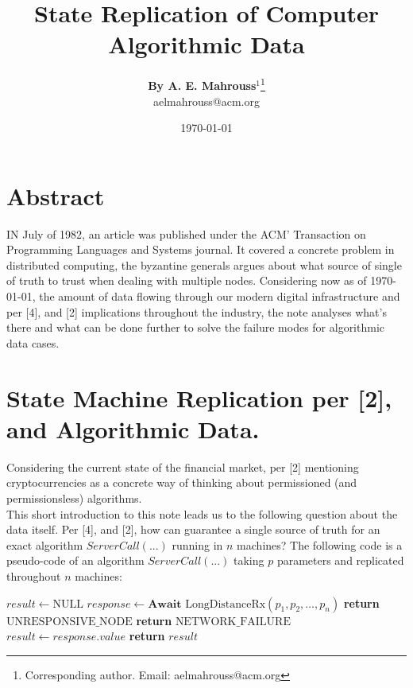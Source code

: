 \documentclass[10pt, twocolumn]{article}
\title{%
  \vspace{-1.5em}%
  \large\textbf{State Replication of Computer Algorithmic Data}%
}
\author{%
  \textbf{By A. E. Mahrouss}$^{1}$\thanks{Corresponding author. Email: aelmahrouss@acm.org}
  \\aelmahrouss@acm.org\\[0.4em]
}
\date{%
  \small \today
}
\theoremstyle{plain}
\theoremstyle{definition}
\theoremstyle{remark}
\begin{document}

\twocolumn[{%
  \maketitle
  \vspace{-0.5em}
  \vspace{0.8em}
  \rule{\linewidth}{0.4pt}
  \vspace{1em}
}]


\section{Abstract}

\lettrine[lines=2, lhang=0.1, loversize=0.2]{I}N July of 1982, an article was published under the ACM' Transaction on Programming Languages and Systems journal. It covered a concrete problem in distributed computing, the byzantine generals argues about what source of single of truth to trust when dealing with multiple nodes. Considering now as of \today, the amount of data flowing through our modern digital infrastructure and per [4], and [2] implications throughout the industry, the note analyses what's there and what can be done further to solve the failure modes for algorithmic data cases.

\section{State Machine Replication per [2], and Algorithmic Data.}

Considering the current state of the financial market, per [2] mentioning cryptocurrencies as a concrete way of thinking about permissioned (and permissionsless) algorithms.\\
This short introduction to this note leads us to the following question about the data itself. Per [4], and [2], how can guarantee a single source of truth for an exact algorithm $ServerCall(...)$ running in $n$ machines? The following code is a pseudo-code of an algorithm $ServerCall(...)$ taking $p$ parameters and replicated throughout $n$ machines:

\begin{algorithm}
\caption{ServerCall(...)}
\begin{algorithmic}[1]
    \State $result \leftarrow \text{NULL}$
    \State $response \leftarrow \textbf{Await } \text{LongDistanceRx}(p_1, p_2, \dots, p_n)$
        \State \textbf{return} $\text{UNRESPONSIVE\_NODE}$
        \State \textbf{return} $\text{NETWORK\_FAILURE}$
    \Else
        \State $result \leftarrow response.value$
        \State \textbf{return} $result$
    \EndIf
\EndProcedure
\end{algorithmic}
\end{algorithm}
\end{document}
